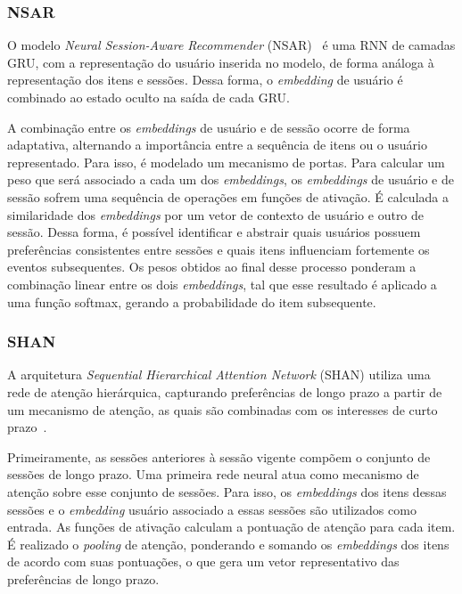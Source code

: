 \subsubsection{NSAR}
 O modelo \textit{Neural
Session-Aware Recommender} (NSAR)~\cite{phuong2019neural} é uma RNN de camadas
GRU, com a representação do usuário inserida no modelo, de forma análoga à
representação dos itens e sessões. Dessa forma, o \textit{embedding} de usuário
é combinado ao estado oculto na saída de cada GRU.

A combinação entre os \textit{embeddings} de usuário e de sessão ocorre de forma
adaptativa, alternando a importância entre a sequência de itens ou o usuário
representado. Para isso, é modelado um mecanismo de portas. Para calcular um
peso que será associado a cada um dos \textit{embeddings}, os
\textit{embeddings} de usuário e de sessão sofrem uma sequência de operações em
funções de ativação. É calculada a similaridade dos \textit{embeddings} por um
vetor de contexto de usuário e outro de sessão. Dessa forma, é possível
identificar e abstrair quais usuários possuem preferências consistentes entre
sessões e quais itens influenciam fortemente os eventos subsequentes. Os pesos
obtidos ao final desse processo ponderam a combinação linear entre os dois
\textit{embeddings}, tal que esse resultado é aplicado a uma função softmax,
gerando a probabilidade do item subsequente.

\subsubsection{SHAN}
A arquitetura \textit{Sequential Hierarchical Attention Network} (SHAN) utiliza uma rede
de atenção hierárquica, capturando preferências de longo prazo a partir de um
mecanismo de atenção, as quais são combinadas com os interesses de curto
prazo~\cite{shan}.

Primeiramente, as sessões anteriores à sessão vigente compõem o conjunto de
sessões de longo prazo. Uma primeira rede neural atua como mecanismo de atenção
sobre esse conjunto de sessões. Para isso, os \textit{embeddings} dos itens
dessas sessões e o \textit{embedding} usuário associado a essas sessões são
utilizados como entrada. As funções de ativação calculam a pontuação de atenção
para cada item. É realizado o \textit{pooling} de atenção, ponderando e somando
os \textit{embeddings} dos itens de acordo com suas pontuações, o que gera um
vetor representativo das preferências de longo prazo.

